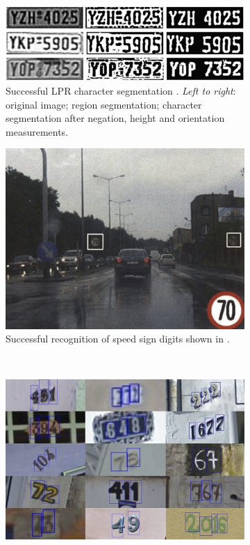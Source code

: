 \begin{figure}[h!]
  \centering
  \begin{subfigure}[b]{0.4\textwidth}
    \includegraphics[width=\textwidth]{images/introduction/lpr}
    \caption{\footnotesize Successful LPR character segmentation \citep{Anagnostopoulos:2006wv}. \textit{Left to right}: original image; region segmentation; character segmentation after negation, height and orientation measurements.}
  \end{subfigure}
  \hspace{0.05\textwidth}
  \begin{subfigure}[b]{0.4\textwidth}
    \includegraphics[width=\textwidth]{images/introduction/tsr}
    \caption{\footnotesize Successful recognition of speed sign digits shown in \citet{Eichner:2008dw}.}
  \end{subfigure}\\
  \vspace{1cm}
  \begin{subfigure}[b]{0.4\textwidth}
    \includegraphics[width=\textwidth]{images/introduction/streetview}

\end{subfigure}
\end{figure}
